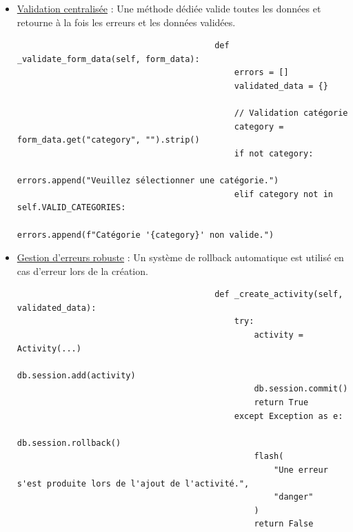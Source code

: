 \documentclass[a4paper,11pt]{article}
\begin{document}
\begin{enumerate}
\begin{itemize}
                            \item \underline{Validation centralisée} : Une méthode dédiée valide toutes les données et retourne à la fois les erreurs et les données validées.
                            
                                \begin{tcolorbox}[colback=lightgray!6, colframe=black, left=-60mm, right=5mm, top=2mm, bottom=0mm, boxrule=0.1mm]
                                    \begin{verbatim}
                                        def _validate_form_data(self, form_data):
                                            errors = []
                                            validated_data = {}
                                            
                                            // Validation catégorie
                                            category = form_data.get("category", "").strip()
                                            if not category:
                                                errors.append("Veuillez sélectionner une catégorie.")
                                            elif category not in self.VALID_CATEGORIES:
                                                errors.append(f"Catégorie '{category}' non valide.")
                                    \end{verbatim}
                                \end{tcolorbox}

                            \item \underline{Gestion d'erreurs robuste} : Un système de rollback automatique est utilisé en cas d'erreur lors de la création.
                            
                                \begin{tcolorbox}[colback=lightgray!6, colframe=black, left=-70mm, right=5mm, top=2mm, bottom=0mm, boxrule=0.1mm]
                                    \begin{verbatim}
                                        def _create_activity(self, validated_data):
                                            try:
                                                activity = Activity(...)
                                                db.session.add(activity)
                                                db.session.commit()
                                                return True
                                            except Exception as e:
                                                db.session.rollback()
                                                flash(
                                                    "Une erreur s'est produite lors de l'ajout de l'activité.", 
                                                    "danger"
                                                )
                                                return False
                                    \end{verbatim}
                                \end{tcolorbox}
                        \end{itemize}


\end{enumerate}
\end{document}
